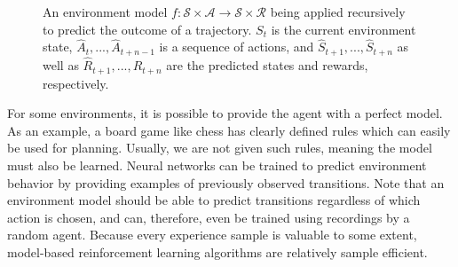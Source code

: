 \begin{figure}[ht]
    \centering
    \caption{An environment model $f : \mathscr{S} \times \mathscr{A} \to \mathscr{S} \times \mathscr{R}$ being applied recursively to predict the outcome of a trajectory. $S_t$ is the current environment state, $\hat{A}_t, ..., \hat{A}_{t+n-1}$ is a sequence of actions, and $\hat{S}_{t+1}, ..., \hat{S}_{t+n}$ as well as $\hat{R}_{t+1}, ..., \hat{R}_{t+n}$ are the predicted states and rewards, respectively.}
    \label{fig:recursive_model}
\end{figure}

For some environments, it is possible to provide the agent with a perfect model. As an example, a board game like chess has clearly defined rules which can easily be used for planning. Usually, we are not given such rules, meaning the model must also be learned. Neural networks can be trained to predict environment behavior by providing examples of previously observed transitions. Note that an environment model should be able to predict transitions regardless of which action is chosen, and can, therefore, even be trained using recordings by a random agent. Because every experience sample is valuable to some extent, model-based reinforcement learning algorithms are relatively sample efficient.

